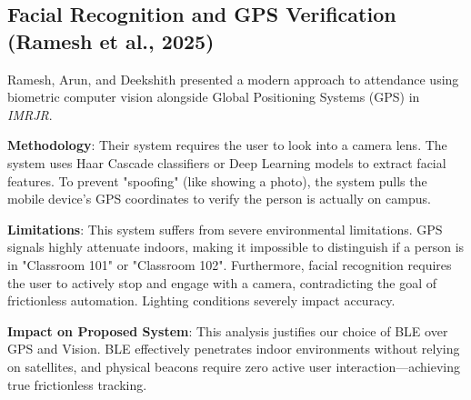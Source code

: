\subsection{Facial Recognition and GPS Verification (Ramesh et al., 2025)}
Ramesh, Arun, and Deekshith \cite{ramesh2025} presented a modern approach to attendance using biometric computer vision alongside Global Positioning Systems (GPS) in \textit{IMRJR}.
\par
\textbf{Methodology}: Their system requires the user to look into a camera lens. The system uses Haar Cascade classifiers or Deep Learning models to extract facial features. To prevent "spoofing" (like showing a photo), the system pulls the mobile device's GPS coordinates to verify the person is actually on campus.
\par
\textbf{Limitations}: This system suffers from severe environmental limitations. GPS signals highly attenuate indoors, making it impossible to distinguish if a person is in "Classroom 101" or "Classroom 102". Furthermore, facial recognition requires the user to actively stop and engage with a camera, contradicting the goal of frictionless automation. Lighting conditions severely impact accuracy.
\par
\textbf{Impact on Proposed System}: This analysis justifies our choice of BLE over GPS and Vision. BLE effectively penetrates indoor environments without relying on satellites, and physical beacons require zero active user interaction—achieving true frictionless tracking.
